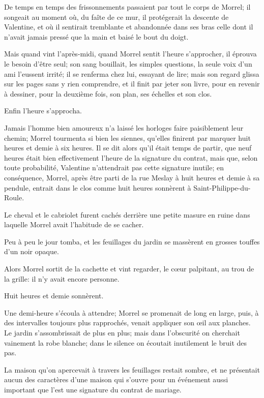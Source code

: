De temps en temps des frissonnements passaient par tout le corps de Morrel; il songeait au moment où, du faîte de ce mur, il protégerait la descente de Valentine, et où il sentirait tremblante et abandonnée dans ses bras celle dont il n'avait jamais pressé que la main et baisé le bout du doigt. 

Mais quand vint l'après-midi, quand Morrel sentit l'heure s'approcher, il éprouva le besoin d'être seul; son sang bouillait, les simples questions, la seule voix d'un ami l'eussent irrité; il se renferma chez lui, essayant de lire; mais son regard glissa sur les pages sans y rien comprendre, et il finit par jeter son livre, pour en revenir à dessiner, pour la deuxième fois, son plan, ses échelles et son clos. 

Enfin l'heure s'approcha. 

Jamais l'homme bien amoureux n'a laissé les horloges faire paisiblement leur chemin; Morrel tourmenta si bien les siennes, qu'elles finirent par marquer huit heures et demie à six heures. Il se dit alors qu'il était temps de partir, que neuf heures était bien effectivement l'heure de la signature du contrat, mais que, selon toute probabilité, Valentine n'attendrait pas cette signature inutile; en conséquence, Morrel, après être parti de la rue Meslay à huit heures et demie à sa pendule, entrait dans le clos comme huit heures sonnèrent à Saint-Philippe-du-Roule. 

Le cheval et le cabriolet furent cachés derrière une petite masure en ruine dans laquelle Morrel avait l'habitude de se cacher. 

Peu à peu le jour tomba, et les feuillages du jardin se massèrent en grosses touffes d'un noir opaque. 

Alors Morrel sortit de la cachette et vint regarder, le cœur palpitant, au trou de la grille: il n'y avait encore personne.  

Huit heures et demie sonnèrent. 

Une demi-heure s'écoula à attendre; Morrel se promenait de long en large, puis, à des intervalles toujours plus rapprochés, venait appliquer son œil aux planches. Le jardin s'assombrissait de plus en plus; mais dans l'obscurité on cherchait vainement la robe blanche; dans le silence on écoutait inutilement le bruit des pas. 

La maison qu'on apercevait à travers les feuillages restait sombre, et ne présentait aucun des caractères d'une maison qui s'ouvre pour un événement aussi important que l'est une signature du contrat de mariage. 

